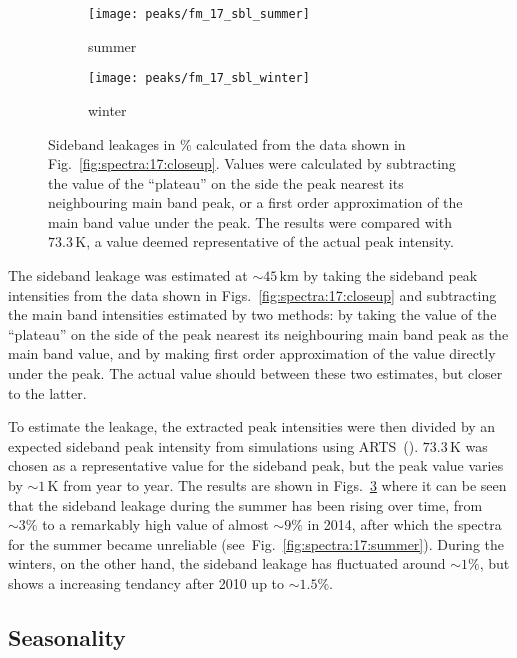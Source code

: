 \begin{figure}[ht]
    \centering
    \begin{subfigure}[b]{0.9545\textwidth}
        \texttt{[image: peaks/fm\_17\_sbl\_summer]}
        \caption{summer}\label{fig:sbl:17:summer}
    \end{subfigure}
    \begin{subfigure}[b]{0.9545\textwidth}
        \texttt{[image: peaks/fm\_17\_sbl\_winter]}
        \caption{winter}\label{fig:sbl:17:winter}
    \end{subfigure}
    \caption{Sideband leakages in \% calculated from the data shown in
        Fig.~\ref{fig:spectra:17:closeup}. Values were calculated by
        subtracting the value of the ``plateau'' on the side the peak nearest
        its neighbouring main band peak, or a first order approximation of the
        main band value under the peak.  The results were compared with
        $73.3\,\mathrm{K}$, a value deemed representative of the actual peak
        intensity.}\label{fig:sbl:17}
\end{figure}

\noindent
The sideband leakage was estimated at $\sim45\,\mathrm{km}$ by taking the
sideband peak intensities from the data shown in
Figs.~\ref{fig:spectra:17:closeup} and subtracting the main band intensities
estimated by two methods:  by taking the value of the ``plateau'' on the side
of the peak nearest its neighbouring main band peak as the main band
value, and by making first order approximation of the value directly under the
peak.  The actual value should between these two estimates, but closer to the
latter.

To estimate the leakage, the extracted peak intensities were then divided by an
expected sideband peak intensity from simulations using
ARTS~(\cite{buehler:artst:05}).  $73.3\,\mathrm{K}$ was chosen as a
representative value for the sideband peak, but the peak value varies by
$\sim1\,\mathrm{K}$ from year to year.  The results are shown in
Figs.~\ref{fig:sbl:17}  where it can be seen that the sideband leakage during
the summer has been rising over time, from $\sim3\%$ to a remarkably high value
of almost $\sim9\%$ in 2014, after which the spectra for the summer became
unreliable (see~Fig.~\ref{fig:spectra:17:summer}).  During the winters, on the
other hand, the sideband leakage has fluctuated around $\sim1\%$, but shows a
increasing tendancy after 2010 up to $\sim1.5\%$.


\subsection{Seasonality}
\label{FM17:seasonailty}

